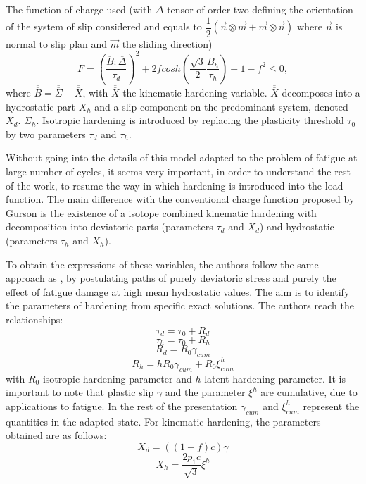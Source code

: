 The function of charge used (with $\Delta$ tensor of order two defining the orientation of the system of slip considered and equals to 
$\dfrac{1}{2}\left(\vec{n}\otimes\vec{m}+\vec{m}\otimes\vec{n} \right)  $ where $\vec{n}$ is normal to slip plan and $\vec{m}$ the sliding direction)
\begin{equation}
F=\left( \dfrac{\overline{\overline{B}}:\overline{\overline{\Delta}}}{\tau_d}\right) ^2+2fcosh\left(\dfrac{\sqrt{3}}{2}\dfrac{B_h}{\tau_h}\right)-1-f^2\leqslant 0 ,
\label{eq.monchiet1}
\end{equation}
where $\overline{\overline{B}}=\overline{\overline{\Sigma}}-\overline{\overline{X}}$, with $\overline{\overline{X}}$ the  kinematic hardening variable. $\overline{\overline{X}}$  decomposes into a hydrostatic part $X_h$ and a slip component on the predominant system, denoted $X_d$. $\Sigma_h$. Isotropic hardening is introduced by replacing the plasticity threshold $\tau_0$ by two parameters $\tau_d$ and $\tau_h$.

Without going into the details of this model adapted to the problem of fatigue at large number of cycles, it seems very important, in order to understand the rest of the work, to resume the way in which hardening is introduced into the load function. The main difference with the conventional charge function proposed by Gurson is the existence of a isotope combined kinematic hardening with decomposition into deviatoric parts (parameters $\tau_d$ and $X_d$) and hydrostatic (parameters $\tau_h$ and $X_h$).

To obtain the expressions of these variables, the authors follow the same approach as \cite{leblond1995improved}, by postulating paths of purely deviatoric stress and purely the effect of fatigue damage at high mean hydrostatic values. The aim is to identify the parameters of hardening from specific exact solutions. The authors reach the relationships:
\begin{equation}\tau_d = \tau_0 + R_d
\label{eq.monchiet10}
\end{equation}
\begin{equation}\tau_h = \tau_0 + R_h
\label{eq.monchiet11}
\end{equation}
\begin{equation}R_d=R_0\gamma_{cum}
\label{eq.monchiet12}
\end{equation}
\begin{equation}R_h=hR_0\gamma_{cum}+R_0\xi_{cum}^h
\label{eq.monchiet13}
\end{equation}
with $R_0$ isotropic hardening parameter and $h$ latent hardening parameter. It is important to note that plastic slip $\gamma$ and the parameter $\xi^h$ are cumulative, due to applications to fatigue. In the rest of the presentation $\gamma_{cum}$ and $\xi_{cum}^h$
represent the quantities in the adapted state. For kinematic hardening, the parameters obtained are as follows:
\begin{equation}
X_d=((1-f)c)\gamma
\label{eq.monchiet14}
\end{equation}
\begin{equation}
X_h=\dfrac{2p_1c}{\sqrt{3}}\xi^h
\label{eq.monchiet15}
\end{equation}

